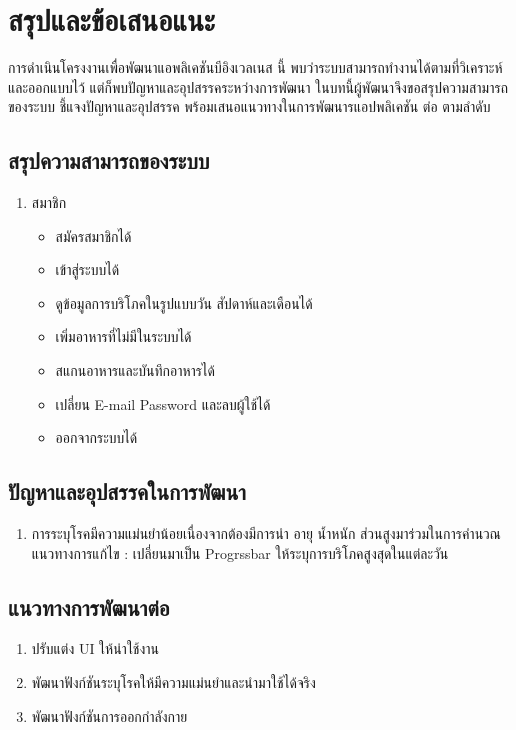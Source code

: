 \chapter{สรุปและข้อเสนอแนะ}

การดำเนินโครงงานเพื่อพัฒนาแอพลิเคชันบีอิงเวลเนส นี้ พบว่าระบบสามารถทำงานได้ตามที่วิเคราะห์และออกแบบไว้ แต่ก็พบปัญหาและอุปสรรคระหว่างการพัฒนา ในบทนี้ผู้พัฒนาจึงขอสรุปความสามารถของระบบ ชี้แจงปัญหาและอุปสรรค พร้อมเสนอแนวทางในการพัฒนารแอปพลิเคชัน ต่อ ตามลำดับ

\section{สรุปความสามารถของระบบ}
\begin{enumerate}

			\item สมาชิก
			\begin{itemize}
				\item สมัครสมาชิกได้
				\item เข้าสู่ระบบได้
				\item ดูข้อมูลการบริโภคในรูปแบบวัน สัปดาห์และเดือนได้
				\item  เพิ่มอาหารที่ไม่มีในระบบได้ 
				\item  สแกนอาหารและบันทึกอาหารได้
				\item  เปลี่ยน E-mail Password และลบผู้ใช้ได้ 
				\item  ออกจากระบบได้ 
			\end{itemize}
		\end{enumerate}
	
\section{ปัญหาและอุปสรรคในการพัฒนา}
  \begin{enumerate}
   \item การระบุโรคมีความแม่นยำน้อยเนื่องจากต้องมีการนำ อายุ น้ำหนัก ส่วนสูงมาร่วมในการคำนวณ \\ 
   แนวทางการแก้ไข : เปลี่ยนมาเป็น Progrssbar ให้ระบุการบริโภคสูงสุดในแต่ละวัน 

  \end{enumerate}

\section{แนวทางการพัฒนาต่อ}
\begin{enumerate}
	\item ปรับแต่ง UI ให้น่าใช้งาน
 	\item พัฒนาฟังก์ชันระบุโรคให้มีความแม่นยำและนำมาใช้ได้จริง
 	\item พัฒนาฟังก์ชันการออกกำลังกาย
\end{enumerate}





